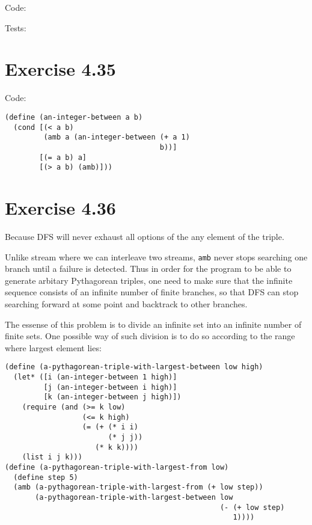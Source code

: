 \documentclass[../main.tex]{subfiles}
\begin{document}
Code:



Tests:



\section{Exercise 4.35}

Code:

\begin{lstlisting}
(define (an-integer-between a b)
  (cond [(< a b)
         (amb a (an-integer-between (+ a 1)
                                    b))]
        [(= a b) a]
        [(> a b) (amb)]))
\end{lstlisting}

\section{Exercise 4.36}

Because DFS will never exhaust all options of the any element of the triple.

Unlike stream where we can interleave two streams, \lstinline{amb} never stops searching one branch until a failure is detected. Thus in order for the program to be able to generate arbitary Pythagorean triples, one need to make sure that the infinite sequence consists of an infinite number of finite branches, so that DFS can stop searching forward at some point and backtrack to other branches.

The essense of this problem is to divide an infinite set into an infinite number of finite sets. One possible way of such division is to do so according to the range where largest element lies:

\begin{lstlisting}
(define (a-pythagorean-triple-with-largest-between low high)
  (let* ([i (an-integer-between 1 high)]
         [j (an-integer-between i high)]
         [k (an-integer-between j high)])
    (require (and (>= k low)
                  (<= k high)
                  (= (+ (* i i)
                        (* j j))
                     (* k k))))
    (list i j k)))
(define (a-pythagorean-triple-with-largest-from low)
  (define step 5)
  (amb (a-pythagorean-triple-with-largest-from (+ low step))
       (a-pythagorean-triple-with-largest-between low
                                                  (- (+ low step)
                                                     1))))
\end{lstlisting}
\end{document}
